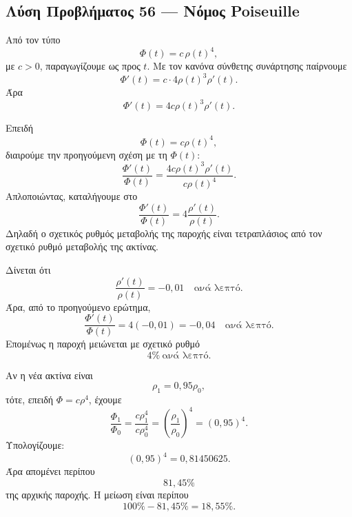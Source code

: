 \subsection*{Λύση Προβλήματος 56 --- Νόμος Poiseuille}

\begin{alist}
  \item Από τον τύπο
        \[
          \Phi(t)=c\,\rho(t)^4,
        \]
        με \(c>0\), παραγωγίζουμε ως προς \(t\). Με τον κανόνα
        σύνθετης συνάρτησης παίρνουμε
        \[
          \Phi'(t)
          =
          c\cdot 4\rho(t)^3\rho'(t).
        \]
        Άρα
        \[
          {
          \Phi'(t)=4c\rho(t)^3\rho'(t)
          }.
        \]

  \item Επειδή
        \[
          \Phi(t)=c\rho(t)^4,
        \]
        διαιρούμε την προηγούμενη σχέση με τη \(\Phi(t)\):
        \[
          \frac{\Phi'(t)}{\Phi(t)}
          =
          \frac{4c\rho(t)^3\rho'(t)}{c\rho(t)^4}.
        \]
        Απλοποιώντας, καταλήγουμε στο
        \[
          {
          \frac{\Phi'(t)}{\Phi(t)}
          =
          4\frac{\rho'(t)}{\rho(t)}
          }.
        \]
        Δηλαδή ο σχετικός ρυθμός μεταβολής της παροχής είναι τετραπλάσιος
        από τον σχετικό ρυθμό μεταβολής της ακτίνας.

  \item Δίνεται ότι
        \[
          \frac{\rho'(t)}{\rho(t)}=-0{,}01
          \quad \text{ανά λεπτό}.
        \]
        Άρα, από το προηγούμενο ερώτημα,
        \[
          \frac{\Phi'(t)}{\Phi(t)}
          =
          4(-0{,}01)
          =
          -0{,}04
          \quad \text{ανά λεπτό}.
        \]
        Επομένως η παροχή μειώνεται με σχετικό ρυθμό
        \[
          {4\%\ \text{ανά λεπτό}}.
        \]

  \item Αν η νέα ακτίνα είναι
        \[
          \rho_1=0{,}95\rho_0,
        \]
        τότε, επειδή \(\Phi=c\rho^4\), έχουμε
        \[
          \frac{\Phi_1}{\Phi_0}
          =
          \frac{c\rho_1^4}{c\rho_0^4}
          =
          \left(\frac{\rho_1}{\rho_0}\right)^4
          =
          (0{,}95)^4.
        \]
        Υπολογίζουμε:
        \[
          (0{,}95)^4=0{,}81450625.
        \]
        Άρα απομένει περίπου
        \[
          {81{,}45\%}
        \]
        της αρχικής παροχής. Η μείωση είναι περίπου
        \[
          100\%-81{,}45\%=18{,}55\%.
        \]
\end{alist}
